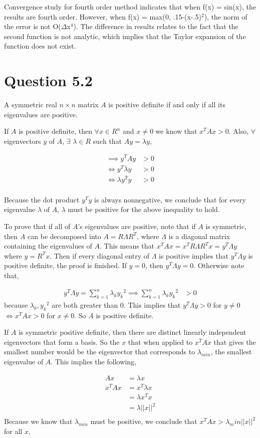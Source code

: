 \documentclass[11pt]{amsart}
\begin{document}
Convergence study for fourth order method indicates that when f(x) = sin(x), the results are fourth order. However, when f(x) = max(0, .15-(x-.5)$^{2}$), the norm of the error is not O($\Delta$x$^{4}$). The difference in results relates to the fact that the second function is not analytic, which implies that the Taylor expansion of the function does not exist. 

\section*{Question 5.2}
A symmetric real $n \times n$ matrix $A$ is positive definite if and only if all its eigenvalues are positive.

If $A$ is positive definite, then $\forall x \in R^n$ and $x \ne 0$ we know that $x^TAx > 0$. Also, $\forall$ eigenvectors $y$ of $A$, $\exists$ $\lambda \in R$ such that $Ay = \lambda y$,

\begin{align*}
\implies y^TAy &> 0\\
\iff y^T\lambda y &> 0\\
\iff \lambda y^Ty &>0\\ 
\end{align*}

Because the dot product $y^Ty$ is always nonnegative, we conclude that for every eigenvalue $\lambda$ of $A$, $\lambda$ must be positive for the above inequality to hold.

To prove that if all of $A$'s eigenvalues are positive, note that if $A$ is symmetric, then $A$ can be decomposed into $A = R\Lambda R^T$, where $\Lambda$ is a diagonal matrix containing the eigenvalues of $A$. This means that $x^TAx = x^TR\Lambda R^Tx = y^T\Lambda y$ where $y = R^Tx$. Then if every diagonal entry of $\Lambda$ is positive implies that $y^T\Lambda y$ is positive definite, the proof is finished.
If $y=0$, then $y^T\Lambda y = 0$. Otherwise note that,

\begin{align*}
y^T\Lambda y = \sum_{k=1}^{n} \lambda _k {y_k}^2 \implies \sum_{k=1}^{n} \lambda _k {y_k}^2 & > 0 
\end{align*}
because $\lambda _k, {y_k}^2$ are both greater than 0. This implies that $y^T \Lambda y > 0$ for $y \ne 0$ $\iff x^TAx > 0$ for $x \ne 0 $. So $A$ is positive definite. 

If $A$ is symmetric positive definite, then there are distinct linearly independent eigenvectors that form a basis. So the $x$ that when applied to $x^TAx$ that gives the smallest number would be the eigenvector that corresponds to $\lambda _{min}$, the smallest eigenvalue of $A$. This implies the following,

\begin{align*}
Ax &= \lambda x\\
x^TAx &= x^T\lambda x\\
&= \lambda x^Tx\\
&= \lambda ||x||^2\\
\end{align*}
Because we know that $\lambda _{min}$ must be positive, we conclude that $x^TAx > \lambda _min ||x||^2$ for all $x$.
\newline
\newline
\end{document}
